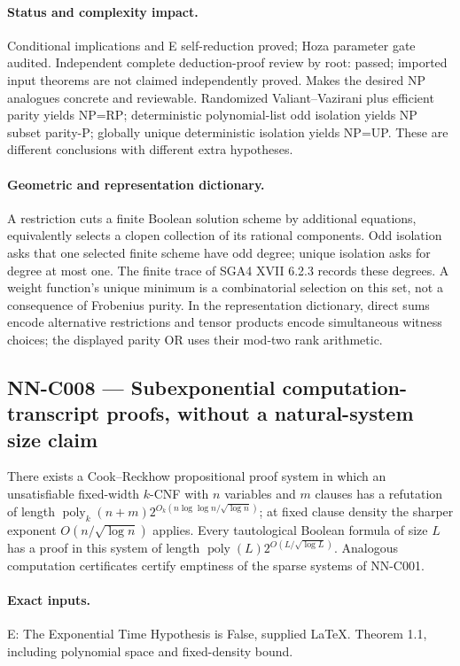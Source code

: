 \paragraph{Status and complexity impact.}
Conditional implications and E self-reduction proved; Hoza parameter gate audited. Independent complete deduction-proof review by root: passed; imported input theorems are not claimed independently proved. Makes the desired NP analogues concrete and reviewable. Randomized Valiant--Vazirani plus efficient parity yields NP=RP; deterministic polynomial-list odd isolation yields NP subset parity-P; globally unique deterministic isolation yields NP=UP. These are different conclusions with different extra hypotheses.

\paragraph{Geometric and representation dictionary.}
A restriction cuts a finite Boolean solution scheme by additional equations, equivalently selects a clopen collection of its rational components. Odd isolation asks that one selected finite scheme have odd degree; unique isolation asks for degree at most one. The finite trace of SGA4 XVII 6.2.3 records these degrees. A weight function's unique minimum is a combinatorial selection on this set, not a consequence of Frobenius purity. In the representation dictionary, direct sums encode alternative restrictions and tensor products encode simultaneous witness choices; the displayed parity OR uses their mod-two rank arithmetic.

\subsection{NN-C008 --- Subexponential computation-transcript proofs, without a natural-system size claim}
\begin{proposition}[NN-C008]
There exists a Cook--Reckhow propositional proof system in which an unsatisfiable fixed-width $k$-CNF with $n$ variables and $m$ clauses has a refutation of length $\operatorname{poly}_k(n+m)2^{O_k(n\log\log n/\sqrt{\log n})}$; at fixed clause density the sharper exponent $O(n/\sqrt{\log n})$ applies. Every tautological Boolean formula of size $L$ has a proof in this system of length $\operatorname{poly}(L)2^{O(L/\sqrt{\log L})}$. Analogous computation certificates certify emptiness of the sparse systems of NN-C001.
\end{proposition}
\paragraph{Exact inputs.}
E: The Exponential Time Hypothesis is False, supplied LaTeX. Theorem 1.1, including polynomial space and fixed-density bound.

